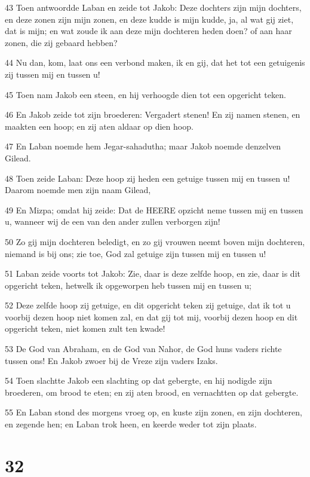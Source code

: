 \par 43 Toen antwoordde Laban en zeide tot Jakob: Deze dochters zijn mijn dochters, en deze zonen zijn mijn zonen, en deze kudde is mijn kudde, ja, al wat gij ziet, dat is mijn; en wat zoude ik aan deze mijn dochteren heden doen? of aan haar zonen, die zij gebaard hebben?
\par 44 Nu dan, kom, laat ons een verbond maken, ik en gij, dat het tot een getuigenis zij tussen mij en tussen u!
\par 45 Toen nam Jakob een steen, en hij verhoogde dien tot een opgericht teken.
\par 46 En Jakob zeide tot zijn broederen: Vergadert stenen! En zij namen stenen, en maakten een hoop; en zij aten aldaar op dien hoop.
\par 47 En Laban noemde hem Jegar-sahadutha; maar Jakob noemde denzelven Gilead.
\par 48 Toen zeide Laban: Deze hoop zij heden een getuige tussen mij en tussen u! Daarom noemde men zijn naam Gilead,
\par 49 En Mizpa; omdat hij zeide: Dat de HEERE opzicht neme tussen mij en tussen u, wanneer wij de een van den ander zullen verborgen zijn!
\par 50 Zo gij mijn dochteren beledigt, en zo gij vrouwen neemt boven mijn dochteren, niemand is bij ons; zie toe, God zal getuige zijn tussen mij en tussen u!
\par 51 Laban zeide voorts tot Jakob: Zie, daar is deze zelfde hoop, en zie, daar is dit opgericht teken, hetwelk ik opgeworpen heb tussen mij en tussen u;
\par 52 Deze zelfde hoop zij getuige, en dit opgericht teken zij getuige, dat ik tot u voorbij dezen hoop niet komen zal, en dat gij tot mij, voorbij dezen hoop en dit opgericht teken, niet komen zult ten kwade!
\par 53 De God van Abraham, en de God van Nahor, de God huns vaders richte tussen ons! En Jakob zwoer bij de Vreze zijn vaders Izaks.
\par 54 Toen slachtte Jakob een slachting op dat gebergte, en hij nodigde zijn broederen, om brood te eten; en zij aten brood, en vernachtten op dat gebergte.
\par 55 En Laban stond des morgens vroeg op, en kuste zijn zonen, en zijn dochteren, en zegende hen; en Laban trok heen, en keerde weder tot zijn plaats.

\chapter{32}

